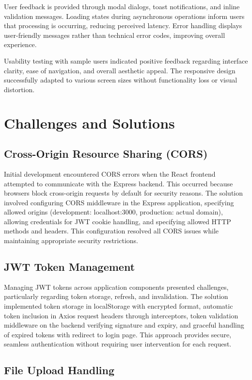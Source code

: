 \documentclass[12pt,a4paper]{report}
\begin{document}
	User feedback is provided through modal dialogs, toast notifications, and inline validation messages. Loading states during asynchronous operations inform users that processing is occurring, reducing perceived latency. Error handling displays user-friendly messages rather than technical error codes, improving overall experience.
	
	Usability testing with sample users indicated positive feedback regarding interface clarity, ease of navigation, and overall aesthetic appeal. The responsive design successfully adapted to various screen sizes without functionality loss or visual distortion.
	
	\section{Challenges and Solutions}
	
	\subsection{Cross-Origin Resource Sharing (CORS)}
	
	Initial development encountered CORS errors when the React frontend attempted to communicate with the Express backend. This occurred because browsers block cross-origin requests by default for security reasons. The solution involved configuring CORS middleware in the Express application, specifying allowed origins (development: localhost:3000, production: actual domain), allowing credentials for JWT cookie handling, and specifying allowed HTTP methods and headers. This configuration resolved all CORS issues while maintaining appropriate security restrictions.
	
	\subsection{JWT Token Management}
	
	Managing JWT tokens across application components presented challenges, particularly regarding token storage, refresh, and invalidation. The solution implemented token storage in localStorage with encrypted format, automatic token inclusion in Axios request headers through interceptors, token validation middleware on the backend verifying signature and expiry, and graceful handling of expired tokens with redirect to login page. This approach provides secure, seamless authentication without requiring user intervention for each request.
	
	\subsection{File Upload Handling}
	
\end{document}
